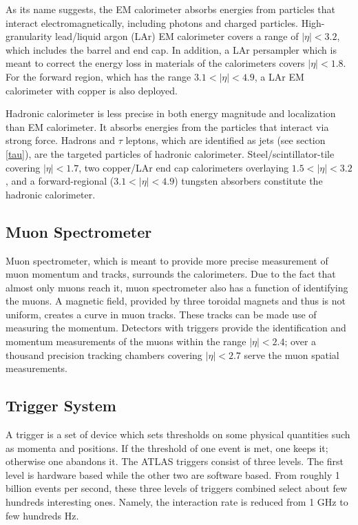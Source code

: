 \documentclass[class=NCU_thesis, crop=false]{standalone}
\begin{document}
		As its name suggests, the EM calorimeter absorbs energies from particles that interact electromagnetically, including photons and charged particles. High-granularity lead/liquid argon (LAr) EM calorimeter covers a range of $\lvert \eta \rvert < 3.2$, which includes the barrel and end cap. In addition, a LAr persampler which is meant to correct the energy loss in materials of the calorimeters covers $\lvert \eta \rvert < 1.8$. For the forward region, which has the range $3.1 < \lvert \eta \rvert < 4.9$, a LAr EM calorimeter with copper is also deployed.
		
		Hadronic calorimeter is less precise in both energy magnitude and localization than EM calorimeter. It absorbs energies from the particles that interact via strong force. Hadrons and $\tau$ leptons, which are identified as jets (see section \ref{tau}), are the targeted particles of hadronic calorimeter. Steel/scintillator-tile covering $\lvert \eta \rvert < 1.7$, two copper/LAr end cap calorimeters overlaying $1.5 < \lvert \eta \rvert < 3.2$, and a forward-regional ($3.1 < \lvert \eta \rvert < 4.9$) tungsten absorbers constitute the hadronic calorimeter.
	
	\subsection{Muon Spectrometer}
		Muon spectrometer, which is meant to provide more precise measurement of muon momentum and tracks, surrounds the calorimeters. Due to the fact that almost only muons reach it, muon spectrometer also has a function of identifying the muons. A magnetic field, provided by three toroidal magnets and thus is not uniform, creates a curve in muon tracks. These tracks can be made use of measuring the momentum. Detectors with triggers provide the identification and momentum measurements of the muons within the range $\lvert \eta \rvert < 2.4$; over a thousand precision tracking chambers covering $\lvert \eta \rvert < 2.7$ serve the muon spatial measurements.
		
	\subsection{Trigger System}
		A trigger is a set of device which sets thresholds on some physical quantities such as momenta and positions. If the threshold of one event is met, one keeps it; otherwise one abandons it. The ATLAS triggers consist of three levels. The first level is hardware based while the other two are software based. From roughly 1 billion events per second, these three levels of triggers combined select about few hundreds interesting ones. Namely, the interaction rate is reduced from 1 GHz to few hundreds Hz.
		
\end{document}
